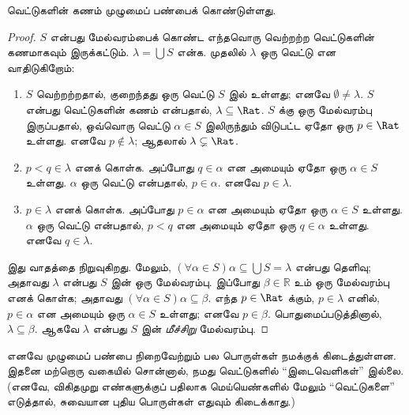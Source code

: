 \documentclass[../../../include/open-logic-section]{subfiles}
\begin{document}
\begin{thm}
வெட்டுகளின் கணம் முழுமைப் பண்பைக் கொண்டுள்ளது.
\end{thm}

\begin{proof}
$S$ என்பது மேல்வரம்பைக் கொண்ட எந்தவொரு வெற்றற்ற வெட்டுகளின்
கணமாகவும் இருக்கட்டும். $\lambda = \bigcup S$ என்க.
முதலில் $\lambda$ ஒரு வெட்டு என வாதிடுகிறோம்:
\begin{enumerate}
\item $S$ வெற்றற்றதால், குறைந்தது ஒரு வெட்டு $S$ இல் உள்ளது;
எனவே $\emptyset \neq \lambda$.
$S$ என்பது வெட்டுகளின் கணம் என்பதால், $\lambda \subseteq \Rat$.
$S$ க்கு ஒரு மேல்வரம்பு இருப்பதால்,
ஒவ்வொரு வெட்டு $\alpha \in S$ இலிருந்தும் விடுபட்ட ஏதோ ஒரு
$p \in \Rat$ உள்ளது.
எனவே $p\notin \lambda$; ஆதலால் $\lambda \subsetneq \Rat$.
\item $p < q \in \lambda$ எனக் கொள்க.
அப்போது $q \in \alpha$ என அமையும் ஏதோ ஒரு $\alpha \in S$ உள்ளது.
$\alpha$ ஒரு வெட்டு என்பதால், $p \in \alpha$.
எனவே $p \in \lambda$.
\item $p \in \lambda$ எனக் கொள்க.
அப்போது $p \in \alpha$ என அமையும் ஏதோ ஒரு $\alpha \in S$ உள்ளது.
$\alpha$ ஒரு வெட்டு என்பதால், $p < q$ என அமையும் ஏதோ ஒரு
$q \in \alpha$ உள்ளது. எனவே $q \in \lambda$.
\end{enumerate}
இது வாதத்தை நிறுவுகிறது.
மேலும், $(\forall \alpha \in S)\alpha
\subseteq \bigcup S = \lambda$ என்பது தெளிவு;
அதாவது $\lambda$ என்பது $S$ இன் ஒரு மேல்வரம்பு.
இப்போது $\beta \in \mathbb{R}$ உம் ஒரு மேல்வரம்பு எனக் கொள்க;
அதாவது $(\forall \alpha \in S)\alpha \subseteq \beta$.
எந்த $p \in \Rat$ க்கும், $p \in \lambda$ எனில்,
$p \in \alpha$ என அமையும் ஒரு $\alpha \in S$ உள்ளது;
எனவே $p \in \beta$.
பொதுமைப்படுத்தினால், $\lambda \subseteq \beta$.
ஆகவே $\lambda$ என்பது $S$ இன் \emph{மீச்சிறு} மேல்வரம்பு.
\end{proof}

எனவே முழுமைப் பண்பை நிறைவேற்றும் பல பொருள்கள் நமக்குக் கிடைத்துள்ளன.
இதனை மற்றொரு வகையில் சொன்னால், நமது வெட்டுகளில் ``இடைவெளிகள்'' இல்லை.
(எனவே, விகிதமுறு எண்களுக்குப் பதிலாக மெய்யெண்களில் மேலும்
``வெட்டுகளை'' எடுத்தால், சுவையான புதிய பொருள்கள் எதுவும் கிடைக்காது.)
\end{document}

